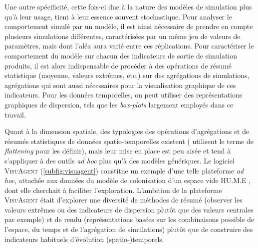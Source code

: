 Une autre spécificité, cette fois-ci due à la nature des modèles de simulation plus qu'à leur usage, tient à leur essence souvent stochastique.
Pour analyser le comportement simulé par un modèle, il est ainsi nécessaire de prendre en compte plusieurs simulations différentes, caractérisées par un même jeu de valeurs de paramètres, mais dont l'aléa aura varié entre ces \og réplications\fg{}.
Pour caractériser le comportement du modèle sur chacun des indicateurs de sortie de simulation produits, il est alors indispensable de procéder à des opérations de résumé statistique (moyenne, valeurs extrêmes, etc.) sur des \og agrégations\fg{} de simulations, agrégations qui sont aussi nécessaires pour la visualisation graphique de ces indicateurs.
Pour les données temporelles, on peut utiliser des représentations graphiques de dispersion, tels que les \textit{box-plots} largement employés dans ce travail.


Quant à la dimension spatiale, des typologies des opérations d'agrégations et de résumés statistiques de données spatio-temporelles existent (\cite{bach_review_2014} utilisent le terme de \og \textit{flattening}\fg{} pour les définir), mais leur mise en place est peu aisée et tend à s'appliquer à des outils \textit{ad hoc} plus qu'à des modèles génériques.
Le logiciel \textsc{VisuAgent} \autocite{cura_visuagent_2014} (\cref{subfig:visuagent}) constitue un exemple d'une telle plateforme \textit{ad hoc}, attachée aux données du modèle de colonisation d'un espace vide \og HU.M.E\fg{} \autocite{lenechet:hal-02025441}, dont elle cherchait à faciliter l'exploration.
L'ambition de la plateforme \textsc{VisuAgent} était d'explorer une diversité de méthodes de résumé (observer les valeurs extrêmes ou des indicateurs de dispersion plutôt que des valeurs centrales par exemple) et de rendu (représentations basées sur les combinaisons possible de l'espace, du temps et de l'agrégation de simulations) plutôt que de construire des indicateurs habituels d'évolution (spatio-)temporels.

